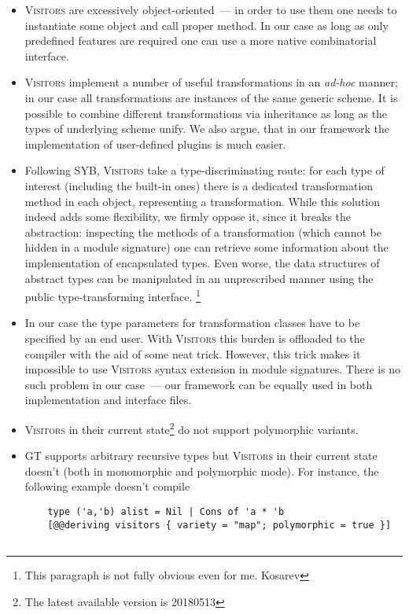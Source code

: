 \begin{itemize}
   \item \textsc{Visitors} are excessively object-oriented~--- in order to use them one needs to instantiate some object and call proper method. In our case as long as
     only predefined features are required one can use a more native combinatorial interface.
     
   \item \textsc{Visitors} implement a number of useful transformations in an \emph{ad-hoc} manner; in our case all transformations are instances of the
     same generic scheme. It is possible to combine different transformations via inheritance as long as the types of underlying scheme unify. We also argue, that
     in our framework the implementation of user-defined plugins is much easier.
     
   \item Following SYB, \textsc{Visitors} take a type-discriminating route: for each type of interest (including the built-in ones) there is a dedicated
     transformation method in each object, representing a transformation. While this solution indeed adds some flexibility, we firmly oppose it, since it
     breaks the abstraction: inspecting the methods of a transformation (which cannot be hidden in a module signature) one can retrieve some
     information about the implementation of encapsulated types. Even worse, the data structures of abstract types can be manipulated in an unprescribed
     manner using the public type-transforming interface.
     \footnote{This paragraph is not fully obvious even for me. Kosarev}

   \item In our case the type parameters for transformation classes have to be specified by an end user. With \textsc{Visitors} this burden is offloaded to the
     compiler with the aid of some neat trick. However, this trick makes it impossible to use \textsc{Visitors} syntax extension in module signatures. There is no
     such problem in our case~--- our framework can be equally used in both implementation and interface files.

   \item \textsc{Visitors} in their current state\footnote{The latest available version is 20180513} do not support polymorphic variants.
   
   \item GT supports arbitrary recursive types but \textsc{Visitors} in their current state doesn't (both in monomorphic and polymorphic mode). For instance, the following example doesn't compile 
   \begin{lstlisting}
    type ('a,'b) alist = Nil | Cons of 'a * 'b
    [@@deriving visitors { variety = "map"; polymorphic = true }]


\end{lstlisting}
\end{itemize}
